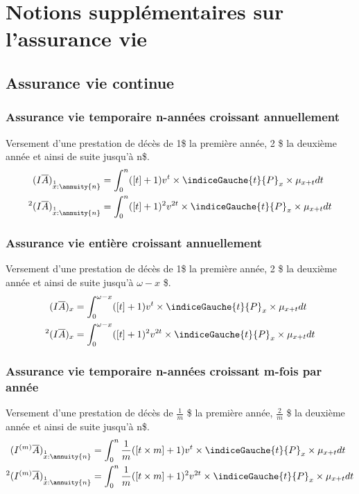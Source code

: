 \chapter{Notions supplémentaires sur l'assurance vie}

\section{Assurance vie continue}

\subsection{Assurance vie  temporaire n-années croissant annuellement}
Versement d'une prestation de décès de 1\$ la première année, 2 \$ la deuxième année et ainsi de suite jusqu'à n\$.
\begin{align*}
(I\overline{A})_{\overset{1}{x}:\annuity{n}} &= \int_{0}^{n}([t] +1 )v^t \times \indiceGauche{t}{P}_{x} \times\mu_{x+t}dt \\
{}^2(I\overline{A})_{\overset{1}{x}:\annuity{n}} &= \int_{0}^{n}([t] +1 )^2v^{2t} \times \indiceGauche{t}{P}_{x}\times \mu_{x+t}dt \\
\end{align*}

\subsection{Assurance vie entière croissant annuellement}
Versement d'une prestation de décès de 1\$ la première année, 2 \$ la deuxième année et ainsi de suite jusqu'à $\omega - x$ \$.
\begin{align*}
(I\overline{A})_{x} &= \int_{0}^{\omega - x}([t] +1 )v^t \times \indiceGauche{t}{P}_{x}\times\mu_{x+t}dt \\
{}^2(I\overline{A})_{x} &= \int_{0}^{\omega - x}([t] +1 )^2v^{2t} \times \indiceGauche{t}{P}_{x} \times\mu_{x+t}dt \\
\end{align*}

\subsection{Assurance vie temporaire n-années croissant m-fois par année}
Versement d'une prestation de décès de $\frac{1}{m}$ \$ la première année, $\frac{2}{m}$ \$ la deuxième année et ainsi de suite jusqu'à n\$.
\begin{align*}
(I^{(m)}\overline{A})_{\overset{1}{x}:\annuity{n}} &= \int_{0}^{n}\frac{1}{m}([t\times m] +1 )v^t \times \indiceGauche{t}{P}_{x}\times \mu_{x+t}dt \\
{}^2(I^{(m)}\overline{A})_{\overset{1}{x}:\annuity{n}} &= \int_{0}^{n}\frac{1}{m}([t\times m] +1 )^2v^{2t} \times \indiceGauche{t}{P}_{x}\times \mu_{x+t}dt \\
\end{align*}


